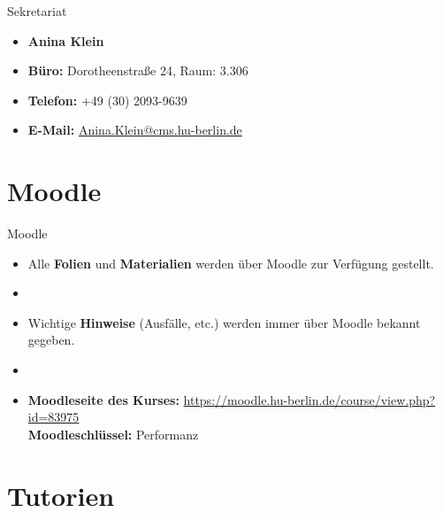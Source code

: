 \begin{frame}{Sekretariat}
	
\begin{itemize}
	\item[] \textbf{Anina Klein}	
	\item \textbf{Büro:} Dorotheenstraße 24, Raum: 3.306
	\item \textbf{Telefon:} +49 (30) 2093-9639
	\item \textbf{E-Mail:} \href{mailto:Anina.Klein@cms.hu-berlin.de}{Anina.Klein@cms.hu-berlin.de}
\end{itemize}	

\end{frame}


\section{Moodle}	

\begin{frame}{Moodle}

\begin{itemize}
	\item Alle \textbf{Folien} und \textbf{Materialien} werden über Moodle zur Verfügung gestellt.
	\item[]
	\item Wichtige \textbf{Hinweise} (Ausfälle, etc.) werden immer über Moodle bekannt gegeben.
	\item[]
	\item \textbf{Moodleseite des Kurses:} \url{https://moodle.hu-berlin.de/course/view.php?id=83975}\\
	\textbf{Moodleschlüssel:} Performanz
\end{itemize}		

\end{frame}


\section{Tutorien}

